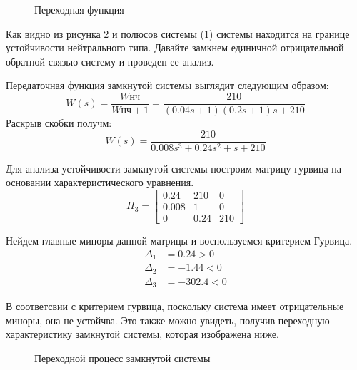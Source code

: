 \documentclass[russian, utf8]{eskdtext}
\begin{document}
\begin{figure}[h!]
    \centering
    \caption{Переходная функция}
\end{figure}

Как видно из рисунка 2 и полюсов системы (1) системы находится на границе устойчивости нейтрального типа. Давайте замкнем единичной отрицательной обратной связью систему и проведен ее анализ. \par
Передаточная функция замкнутой системы выглядит следующим образом: 
\begin{equation*}
    W(s) = \frac{W\text{нч}}{W\text{нч} + 1} = \frac{210}{(0.04s + 1)(0.2s + 1)s + 210}
\end{equation*}
Раскрыв скобки получм: 
\begin{equation}
    W(s) = \frac{210}{0.008s^3 + 0.24s^2 + s + 210}
\end{equation}

\newpage
Для анализа устойчивости замкнутой системы построим матрицу гурвица на основании характеристического уравнения.
\begin{equation}
    H_3 = \begin{bmatrix}
        0.24 & 210 & 0 \\
        0.008 & 1 & 0 \\
        0 & 0.24 & 210
    \end{bmatrix}
\end{equation}

Нейдем главные миноры данной матрицы и воспользуемся критерием Гурвица.
\begin{align*}
    \Delta_1 & = 0.24 > 0 \\
    \Delta_2 & = -1.44 < 0 \\
    \Delta_3 & = -302.4 < 0
\end{align*}

В соответсвии с критерием гурвица, поскольку система имеет отрицательные миноры, она не устойчва. Это также можно увидеть, получив переходную характеристику замкнутой системы, которая изображена ниже. 

\begin{figure}[h!]
    \centering
    \caption{Переходной процесс замкнутой системы}
\end{figure}
\end{document}
